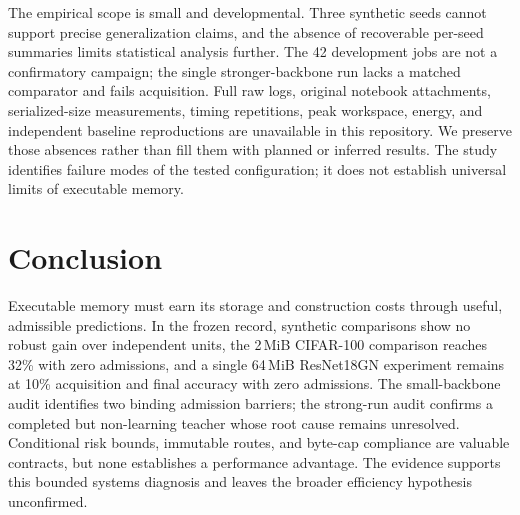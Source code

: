 \documentclass{article}
\begin{document}
The empirical scope is small and developmental. Three synthetic seeds cannot support precise generalization claims, and the absence of recoverable per-seed summaries limits statistical analysis further. The 42 development jobs are not a confirmatory campaign; the single stronger-backbone run lacks a matched comparator and fails acquisition. Full raw logs, original notebook attachments, serialized-size measurements, timing repetitions, peak workspace, energy, and independent baseline reproductions are unavailable in this repository. We preserve those absences rather than fill them with planned or inferred results. The study identifies failure modes of the tested configuration; it does not establish universal limits of executable memory.

\section{Conclusion}
Executable memory must earn its storage and construction costs through useful, admissible predictions. In the frozen record, synthetic comparisons show no robust gain over independent units, the 2\,MiB CIFAR-100 comparison reaches 32\% with zero admissions, and a single 64\,MiB ResNet18GN experiment remains at 10\% acquisition and final accuracy with zero admissions. The small-backbone audit identifies two binding admission barriers; the strong-run audit confirms a completed but non-learning teacher whose root cause remains unresolved. Conditional risk bounds, immutable routes, and byte-cap compliance are valuable contracts, but none establishes a performance advantage. The evidence supports this bounded systems diagnosis and leaves the broader efficiency hypothesis unconfirmed.

\FloatBarrier
\label{mainlastpage}


\end{document}
